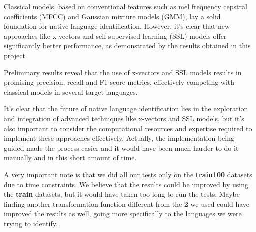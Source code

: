 \documentclass{Interspeech2024}
\begin{document}
Classical models, based on conventional features such as mel frequency cepstral
coefficients (MFCC) and Gaussian mixture models (GMM), lay a solid foundation
for native language identification. However, it's clear that new approaches
like x-vectors and self-supervised learning (SSL) models offer significantly better
performance, as demonstrated by the results obtained in this project.

Preliminary results reveal that the use of x-vectors and SSL models results in
promising precision, recall and F1-score metrics, effectively competing with
classical models in several target languages.

It's clear that the future of native language identification lies in the
exploration and integration of advanced techniques like x-vectors and SSL models,
but it's also important to consider the computational resources and expertise
required to implement these approaches effectively. Actually, the implementation 
being guided made the process easier and it would have been much harder to do it
manually and in this short amount of time.

A very important note is that we did all our tests only on the
\textbf{train100} datasets due to time constraints. We believe that the results
could be improved by using the \textbf{train} datasets, but it would have taken
too long to run the tests. Maybe finding another transformation function 
different from the \textbf{2} we used could have improved the results as well,
going more specifically to the languages we were trying to identify.
\end{document}
